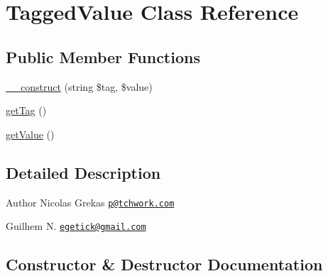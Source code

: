\hypertarget{class_symfony_1_1_component_1_1_yaml_1_1_tag_1_1_tagged_value}{}\section{Tagged\+Value Class Reference}
\label{class_symfony_1_1_component_1_1_yaml_1_1_tag_1_1_tagged_value}
\subsection*{Public Member Functions}
\begin{DoxyCompactItemize}
\item 
\mbox{\hyperlink{class_symfony_1_1_component_1_1_yaml_1_1_tag_1_1_tagged_value_ab052ebb1c5307a18c9661df2e699ca7b}{\+\_\+\+\_\+construct}} (string \$tag, \$value)
\item 
\mbox{\hyperlink{class_symfony_1_1_component_1_1_yaml_1_1_tag_1_1_tagged_value_ab86ba36154b20e6bbfa3ba705f12f9d6}{get\+Tag}} ()
\item 
\mbox{\hyperlink{class_symfony_1_1_component_1_1_yaml_1_1_tag_1_1_tagged_value_ac0bc18784b182c89fcfd276625aef435}{get\+Value}} ()
\end{DoxyCompactItemize}


\subsection{Detailed Description}
\begin{DoxyAuthor}{Author}
Nicolas Grekas \href{mailto:p@tchwork.com}{\tt p@tchwork.\+com} 

Guilhem N. \href{mailto:egetick@gmail.com}{\tt egetick@gmail.\+com} 
\end{DoxyAuthor}


\subsection{Constructor \& Destructor Documentation}
\mbox{\label{class_symfony_1_1_component_1_1_yaml_1_1_tag_1_1_tagged_value_ab052ebb1c5307a18c9661df2e699ca7b}} 
